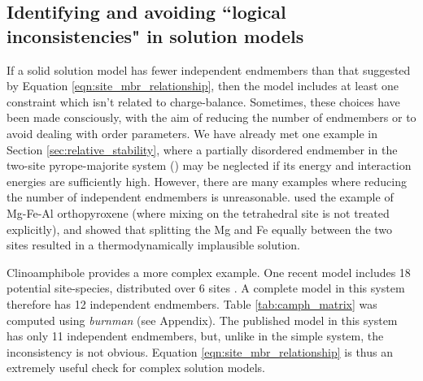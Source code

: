 \documentclass[preprint,12pt]{elsarticle}
\begin{document}
\subsection{Identifying and avoiding ``logical inconsistencies" in solution models}
\label{sec:inconsistency}
If a solid solution model has fewer independent endmembers than that suggested by Equation \ref{eqn:site_mbr_relationship}, then the model includes at least one constraint which isn't related to charge-balance. Sometimes, these choices have been made consciously, with the aim of reducing the number of endmembers or to avoid dealing with order parameters. We have already met one example in Section \ref{sec:relative_stability}, where a partially disordered endmember in the two-site pyrope-majorite system () may be neglected if its energy and interaction energies are sufficiently high. However, there are many examples where reducing the number of independent endmembers is unreasonable. \citet{HP2006} used the example of Mg-Fe-Al orthopyroxene  (where mixing on the tetrahedral site is not treated explicitly), and showed that splitting the Mg and Fe equally between the two sites resulted in a thermodynamically implausible solution.

Clinoamphibole provides a more complex example. One recent model includes 18 potential site-species, distributed over 6 sites \citep{Green2016,Holland2018}. A complete model in this system therefore has 12 independent endmembers. Table \ref{tab:camph_matrix} was computed using \emph{burnman} (see Appendix). The published model in this system has only 11 independent endmembers, but, unlike in the simple system, the inconsistency is not obvious. Equation \ref{eqn:site_mbr_relationship} is thus an extremely useful check for complex solution models. 
\end{document}

